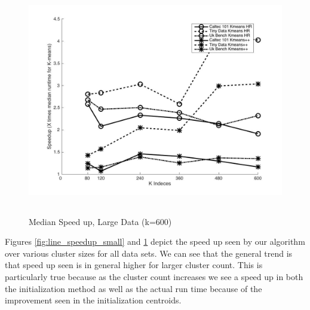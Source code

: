 \documentclass{vldb}
\begin{document}
\begin{figure}[h!]
    \centering
        \includegraphics[width=\textwidth, height=10cm,keepaspectratio]{k_means_speedup_line_large}
    \caption{Median Speed up, Large Data (k=600)}
    \label{fig:line_speedup_large}
\end{figure}

Figures \ref{fig:line_speedup_small} and \ref{fig:line_speedup_large} depict the speed up seen by our algorithm over various cluster sizes for all data sets. We can see that the general trend is that speed up seen is in general higher for larger cluster count. This is particularly true because as the cluster count increases we see a speed up in both the initialization method as well as the actual run time because of the improvement seen in the initialization centroids.
\end{document}
